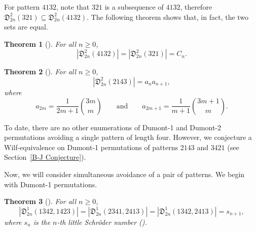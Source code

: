 \documentclass[
final
]{dmtcs-episciences}
\newtheorem{theorem}{Theorem}[section]%
\theoremstyle{definition}
\theoremstyle{remark}
\begin{document}
For pattern $4132$, note that $321$ is a subsequence of $4132$, therefore $\mathfrak{D}^2_{2n} (321) \subseteq \mathfrak{D}^2_{2n} (4132)$. The following theorem shows that, in fact, the two sets are equal.

\begin{theorem}[\cite{Burstein_Dyck}]
For all $n\ge 0$,
\[
|\mathfrak{D}^2_{2n} (4132)| = |\mathfrak{D}^2_{2n} (321)| = C_n.
\]
\end{theorem}

\begin{theorem}[\cite{Burstein_Dyck}]
For all $n\ge 0$,
\[
|\mathfrak{D}^2_{2n} (2143)| = a_n a_{n+1},
\]
where
\[
a_{2m} = \frac{1}{2m+1} \binom{3m}{m} \qquad \text{and} \qquad a_{2m+1} = \frac{1}{m+1} \binom{3m+1}{m}.
\]
\end{theorem}

\vspace{0.2in}

To date, there are no other enumerations of Dumont-1 and Dumont-2 permutations avoiding a single pattern of length four. However, we conjecture a Wilf-equivalence on Dumont-1 permutations of patterns $2143$ and $3421$ (see Section~\ref {B-J Conjecture}).

Now, we will consider simultaneous avoidance of a pair of patterns. We begin with Dumont-1 permutations.

\begin{theorem}[\cite{Burstein_Dyck}]
For all $n\ge 0$,
\[
|\mathfrak{D}^1_{2n} (1342, 1423)| = |\mathfrak{D}^1_{2n} (2341, 2413)| = |\mathfrak{D}^1_{2n} (1342, 2413)| =s_{n+1},
\]
where $s_n$ is the $n$-th little Schr\"oder number (\cite[A001003]{OEIS}).
\end{theorem}
\end{document}
